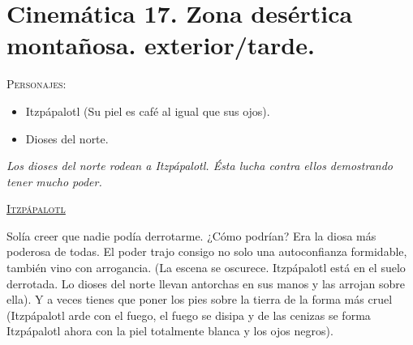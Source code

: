 \section{Cinemática 17. Zona desértica montañosa. exterior/tarde.} \label{Cin:Cinematica17}
\textsc{Personajes}:
\begin{itemize}
\item Itzpápalotl (Su piel es café al igual que sus ojos).
\item Dioses del norte.
\end{itemize}
\textit{Los dioses del norte rodean a Itzpápalotl. Ésta lucha contra ellos demostrando tener mucho poder.}
\begin{center}
\textsc{\underline{Itzpápalotl}}
\\
\par
Solía creer que nadie podía derrotarme. ¿Cómo podrían? Era la diosa más poderosa de todas. El poder trajo consigo no solo una autoconfianza formidable, también vino con arrogancia. (La escena se oscurece. Itzpápalotl está en el suelo derrotada. Lo dioses del norte llevan antorchas en sus manos y las arrojan sobre ella). Y a veces tienes que poner los pies sobre la tierra de la forma más cruel (Itzpápalotl arde con el fuego, el fuego se disipa y de las cenizas se forma Itzpápalotl ahora con la piel totalmente blanca y los ojos negros). 
\end{center}
